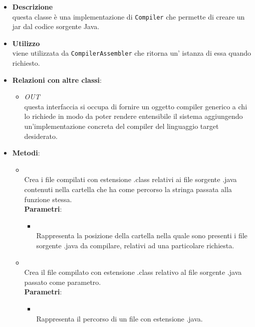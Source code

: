 \begin{itemize}
\item \textbf{Descrizione}\\
questa classe è una implementazione di \texttt{Compiler} che permette di creare un jar dal codice sorgente Java.
\item \textbf{Utilizzo}\\
viene utilizzata da \texttt{CompilerAssembler} che ritorna un' istanza di essa quando richiesto.
\item \textbf{Relazioni con altre classi}:
\begin{itemize}
\item \textit{OUT} \hyperref[\nogloxy{swedesigner::server::compiler::Compiler}]{}\\
questa interfaccia si occupa di fornire un oggetto compiler generico a chi lo richiede in modo da poter rendere entensibile il sistema aggiungendo un'implementazione concreta del compiler del linguaggio target desiderato.
\end{itemize}
\item \textbf{Metodi}:
\begin{itemize}
\item {}
\\ Crea i file compilati con estensione .class relativi ai file sorgente .java contenuti nella cartella che ha come percorso la stringa passata alla funzione stessa.
\\ \textbf{Parametri}:
\begin{itemize}
\item {}
\\ Rappresenta la posizione della cartella nella quale sono presenti i file sorgente .java da compilare, relativi ad una particolare richiesta.
\end{itemize}
\item {}
\\ Crea il file compilato con estensione .class relativo al file sorgente .java passato come parametro.
\\ \textbf{Parametri}:
\begin{itemize}
\item {}
\\ Rappresenta il percorso di un file con estensione .java.
\end{itemize}
\end{itemize}
\end{itemize}
